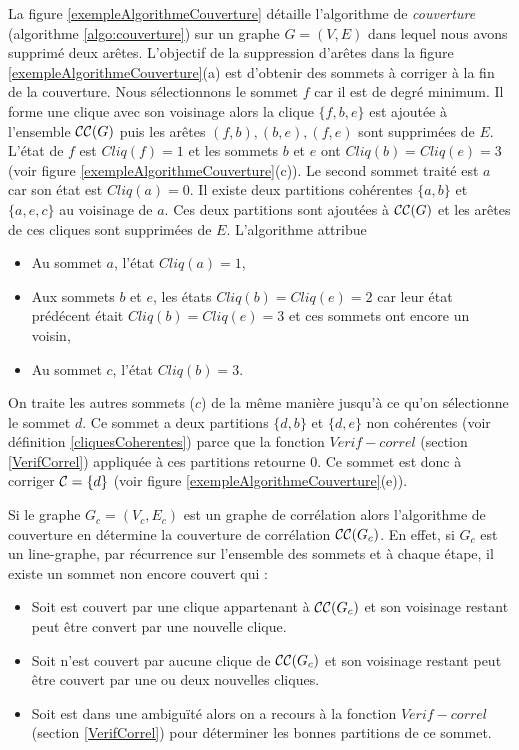  La figure \ref{exempleAlgorithmeCouverture} d\'etaille l'algorithme de {\em couverture} (algorithme \ref{algo:couverture})  sur un graphe $G=(V,E)$  dans lequel nous avons supprim\'e deux ar\^etes. L'objectif de la suppression d'ar\^etes dans la figure \ref{exempleAlgorithmeCouverture}(a) est d'obtenir des sommets \`a corriger \`a la fin de la couverture.
 Nous s\'electionnons le sommet $f$ car il est de degr\'e minimum. 
 Il forme une clique avec son voisinage alors la clique $\{f,b,e\}$ est ajout\'ee \`a l'ensemble  ${\cal CC}(G)$ puis les ar\^etes $(f,b), (b,e), (f,e)$ sont supprim\'ees de $E$. 
 L'\'etat de $f$ est $Cliq(f) = 1$ et les sommets $b$ et $e$ ont $Cliq(b) = Cliq(e) = 3$ (voir figure \ref{exempleAlgorithmeCouverture}(c)). 
 \newline
 Le second sommet trait\'e est $a$ car son \'etat est $Cliq(a) = 0$. Il existe deux partitions coh\'erentes $\{a,b\}$ et $\{a,e,c\}$ au voisinage de $a$. Ces deux partitions sont ajout\'ees \`a    ${\cal CC}(G)$ et les ar\^etes de ces cliques sont supprim\'ees de $E$. L'algorithme attribue 
 \begin{itemize}
\item  Au sommet $a$, l'\'etat $Cliq(a) = 1$,
\item Aux sommets $b$ et $e$, les \'etats $Cliq(b) = Cliq(e) = 2$ car leur \'etat pr\'ed\'ecent \'etait $Cliq(b) = Cliq(e) = 3$ et ces sommets ont encore un voisin,
\item Au sommet $c$, l'\'etat $Cliq(b) = 3$.
 \end{itemize}
 On traite les autres sommets ($c$) de la m\^eme mani\`ere jusqu'\`a ce qu'on s\'electionne le sommet $d$.
 Ce sommet a deux partitions $\{d,b\}$ et $\{d,e\}$ non coh\'erentes (voir d\'efinition \ref{cliquesCoherentes}) parce que la fonction $Verif-correl$ (section \ref{VerifCorrel}) appliqu\'ee \`a ces partitions retourne 0. 
 Ce sommet est donc \`a corriger ${\cal C} = \{d\}$ (voir figure \ref{exempleAlgorithmeCouverture}(e)).
\newline

Si le graphe $G_c=(V_c, E_c)$ est un graphe de corr\'elation alors l'algorithme de couverture en d\'etermine la couverture de corr\'elation ${\cal CC}(G_c)$.
En effet, si $G_c$ est un line-graphe, par r\'ecurrence sur l'ensemble des sommets et \`a chaque \'etape, il existe un sommet non encore couvert qui :
\begin{itemize}
\item Soit est couvert par une clique appartenant \`a ${\cal CC}(G_c)$ et son voisinage restant peut \^etre convert par une nouvelle clique.
\item Soit n'est couvert par aucune clique de  ${\cal CC}(G_c)$ et son voisinage restant peut \^etre couvert par une ou deux nouvelles cliques.
\item Soit est dans une ambigu\"{i}t\'e alors on a recours \`a la fonction $Verif-correl$ (section \ref{VerifCorrel}) pour d\'eterminer les bonnes partitions de ce sommet.
\end{itemize}

